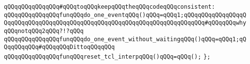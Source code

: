 \verb|qQQqqQQqqQQqqQQq#qQQqtoqQQqkeepqQQqtheqQQqcodeqQQqconsistent:|\newline
\newline
\verb|qQQqqQQqqQQqqQQqfunqQQqdo_one_eventqQQq()qQQq=qQQq1;qQQqqQQqqQQqqQQqqQQqqQQqqQQqqQQqqQQqqQQqqQQqqQQqqQQqqQQqqQQqqQQqqQQqqQQqqQQq#qQQqqQQqwhyqQQqnotqQQq2qQQq?!?qQQq|\newline
\verb|qQQqqQQqqQQqqQQqfunqQQqdo_one_event_without_waitingqQQq()qQQq=qQQq1;qQQqqQQqqQQq#qQQqqQQqDittoqQQqqQQq|\newline
\verb|qQQqqQQqqQQqqQQqfunqQQqreset_tcl_interpqQQq()qQQq=qQQq();|\newline
\newline
\newline
\verb|};|\newline
\newline
\newline
\newline


